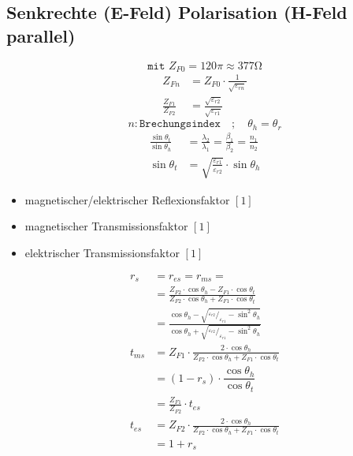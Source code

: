 \subsection{Senkrechte (E-Feld) Polarisation (H-Feld parallel)}


\[ \boxed{\texttt{mit } Z_{F0} = 120\pi \approx 377\si{\ohm}} \]
\begin{align*}
    Z_{Fn}                & = Z_{F0}\cdot\frac{1}{\sqrt{\varepsilon_{rn}}}            \\
    \frac{Z_{F1}}{Z_{F2}} & = \frac{\sqrt{\varepsilon_{r2}}}{\sqrt{\varepsilon_{r1}}}
\end{align*}
\[ n: \texttt{Brechungsindex} \quad ; \quad \theta_h = \theta_r\]
\begin{align*}
    \frac{\sin\theta_t}{\sin\theta_h} & = \frac{\lambda_2}{\lambda_1}= \frac{\beta_1}{\beta_2}= \frac{n_1}{n_2} \\
    \sin\theta_t                      & = \sqrt{\frac{\varepsilon_{r1}}{\varepsilon_{r2}}}\cdot \sin\theta_h
\end{align*}

\begin{itemize}
    \item magnetischer/elektrischer Reflexionsfaktor $[1]$
    \item magnetischer Transmissionsfaktor $[1]$
    \item elektrischer Transmissionsfaktor $[1]$
\end{itemize}
\begin{align*}
    r_s     & =  r_{e s} = r_{m s} =                                                                                                                                          \\
            & = \frac{Z_{F 2} \cdot \cos \theta_h-Z_{F 1} \cdot \cos \theta_t}{Z_{F 2} \cdot \cos \theta_h+Z_{F 1} \cdot \cos \theta_t}                                       \\
            & = \frac{\cos\theta_h-\sqrt{^{\varepsilon_{r2}}/_{\varepsilon_{r1}}-\sin^2\theta_h}}{\cos\theta_h+\sqrt{^{\varepsilon_{r2}}/_{\varepsilon_{r1}}-\sin^2\theta_h}} \\
    t_{m s} & = Z_{F 1} \cdot \frac{2 \cdot \cos \theta_h}{Z_{F 2} \cdot \cos \theta_h+Z_{F 1} \cdot \cos \theta_t}                                                           \\
            & = (1 - r_{s}) \cdot \dfrac{\cos \theta_h}{\cos \theta_t}                                                                                                        \\
            & = \frac{Z_{F1}}{Z_{F2}}\cdot t_{es}                                                                                                                             \\
    t_{e s} & = Z_{F 2} \cdot \frac{2 \cdot \cos \theta_h}{Z_{F 2} \cdot \cos \theta_h+Z_{F 1} \cdot \cos \theta_t}                                                           \\
            & = 1+r_{s}
\end{align*}

